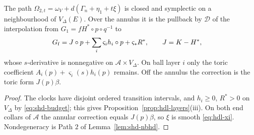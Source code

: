 \begin{proposition}\label{prop:shd-layer-path}
The path $\Omega_{2,t}=\omega_V+d(\Gamma_n+\eta_1+t\xi)$ is closed and symplectic on a neighbourhood of $V_\Delta(E)$. Over the
annulus it is the pullback by $\mathcal D$ of the interpolation from $G_1=fH^*\circ p\circ q^{-1}$ to
\begin{equation}\label{eq:shd-Gf}
 G_{\rm f}=J\circ p+\sum_i\varsigma_i h_i\circ p+\varsigma_*R^*,\qquad J=K-H^*,
\end{equation}
whose $s$-derivative is nonnegative on $\mathcal A\times V_\Delta$. On ball layer $i$ only the toric coefficient
$A_i(p)+\varsigma_i(s)h_i(p)$ remains. Off the annulus the correction is the toric form $J(p)\beta$.
\end{proposition}
\begin{proof}
The clocks have disjoint ordered transition intervals, and $h_i\ge0$, $R^*>0$ on $V_\Delta$ by \eqref{eq:shd-budget}; this gives
Proposition~\ref{prop:hdl-layers}(iii). On both end collars of $\mathcal A$ the annular correction equals $J(p)\beta$, so
$\xi$ is smooth \eqref{eq:hdl-xi}. Nondegeneracy is Path $2$ of Lemma~\ref{lem:shd-nbhd}.
\end{proof}


